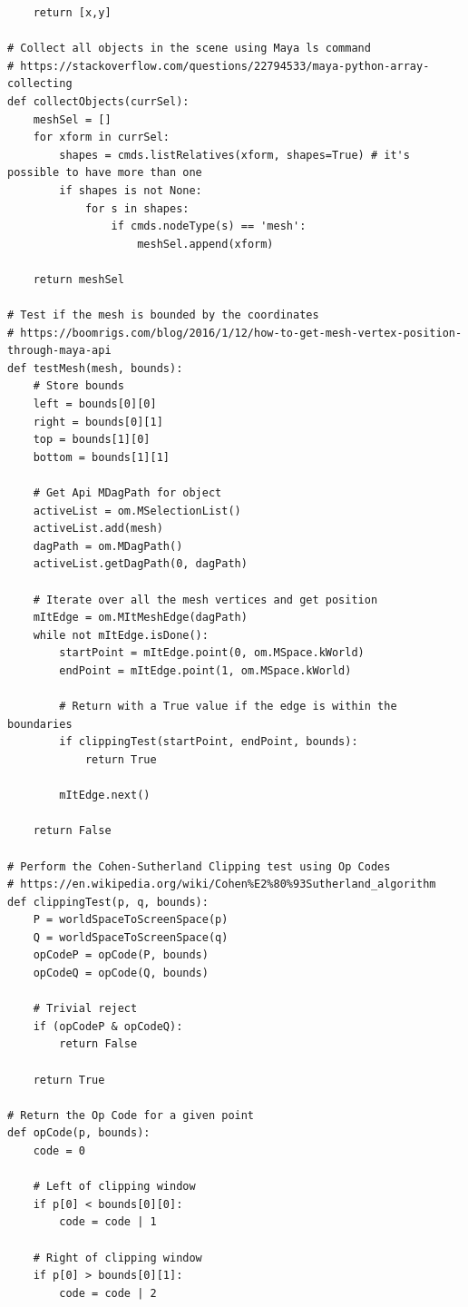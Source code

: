\documentclass[conference]{IEEEtran}
\begin{document}
{{\begin{verbatim}
    return [x,y]

# Collect all objects in the scene using Maya ls command
# https://stackoverflow.com/questions/22794533/maya-python-array-collecting
def collectObjects(currSel):
    meshSel = []
    for xform in currSel:
        shapes = cmds.listRelatives(xform, shapes=True) # it's possible to have more than one
        if shapes is not None:
            for s in shapes:
                if cmds.nodeType(s) == 'mesh':
                    meshSel.append(xform)
  
    return meshSel
    
# Test if the mesh is bounded by the coordinates
# https://boomrigs.com/blog/2016/1/12/how-to-get-mesh-vertex-position-through-maya-api
def testMesh(mesh, bounds):    
    # Store bounds
    left = bounds[0][0]
    right = bounds[0][1]
    top = bounds[1][0]
    bottom = bounds[1][1]
    
    # Get Api MDagPath for object
    activeList = om.MSelectionList()
    activeList.add(mesh)
    dagPath = om.MDagPath()
    activeList.getDagPath(0, dagPath)

    # Iterate over all the mesh vertices and get position
    mItEdge = om.MItMeshEdge(dagPath)
    while not mItEdge.isDone():    	
        startPoint = mItEdge.point(0, om.MSpace.kWorld)
        endPoint = mItEdge.point(1, om.MSpace.kWorld)
        
        # Return with a True value if the edge is within the boundaries
        if clippingTest(startPoint, endPoint, bounds):
            return True
                
        mItEdge.next()
    
    return False
    
# Perform the Cohen-Sutherland Clipping test using Op Codes
# https://en.wikipedia.org/wiki/Cohen%E2%80%93Sutherland_algorithm
def clippingTest(p, q, bounds):
    P = worldSpaceToScreenSpace(p)
    Q = worldSpaceToScreenSpace(q)
    opCodeP = opCode(P, bounds)
    opCodeQ = opCode(Q, bounds)
        
    # Trivial reject
    if (opCodeP & opCodeQ):
        return False
        
    return True

# Return the Op Code for a given point
def opCode(p, bounds):
    code = 0
    
    # Left of clipping window
    if p[0] < bounds[0][0]:
        code = code | 1
    
    # Right of clipping window
    if p[0] > bounds[0][1]:
        code = code | 2
        

\end{verbatim}}}
\end{document}
